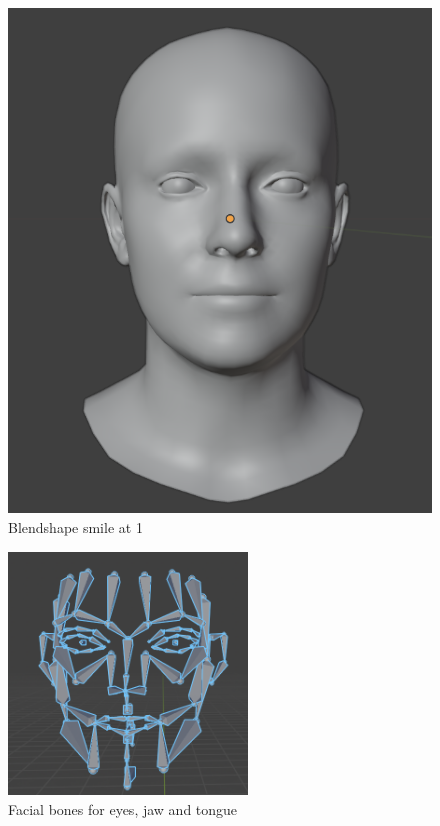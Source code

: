 \begin{subfigure}{0.33\linewidth}
  \includegraphics[width=\linewidth]{images/background_work/blendshapes_example/blendshapes_example_1.png}
  \caption{Blendshape smile at 1}
  \label{fig:blendshapes_example}
\end{subfigure}

\begin{figure}
  \centering \includegraphics[width = 2.5in]{images/background_work/facial_bones.png}
  \caption{Facial bones for eyes, jaw and tongue}
  \label{fig:facial_bones}
\end{figure}


